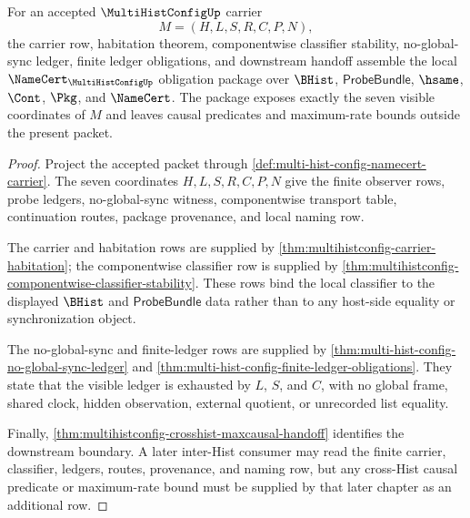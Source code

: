 \begin{theorem}
\label{thm:multihistconfig-namecert-obligation-package}
For an accepted $\MultiHistConfigUp$ carrier
$$
M=(H,L,S,R,C,P,N),
$$
the carrier row, habitation theorem, componentwise classifier stability, no-global-sync ledger, finite ledger obligations, and downstream handoff assemble the local $\NameCert_{\MultiHistConfigUp}$ obligation package over $\BHist$, $\mathsf{ProbeBundle}$, $\hsame$, $\Cont$, $\Pkg$, and $\NameCert$. The package exposes exactly the seven visible coordinates of $M$ and leaves causal predicates and maximum-rate bounds outside the present packet.
\end{theorem}
\begin{proof}
Project the accepted packet through \autoref{def:multi-hist-config-namecert-carrier}. The seven coordinates $H,L,S,R,C,P,N$ give the finite observer rows, probe ledgers, no-global-sync witness, componentwise transport table, continuation routes, package provenance, and local naming row.

The carrier and habitation rows are supplied by \autoref{thm:multihistconfig-carrier-habitation}; the componentwise classifier row is supplied by \autoref{thm:multihistconfig-componentwise-classifier-stability}. These rows bind the local classifier to the displayed $\BHist$ and $\mathsf{ProbeBundle}$ data rather than to any host-side equality or synchronization object.

The no-global-sync and finite-ledger rows are supplied by \autoref{thm:multi-hist-config-no-global-sync-ledger} and \autoref{thm:multi-hist-config-finite-ledger-obligations}. They state that the visible ledger is exhausted by $L$, $S$, and $C$, with no global frame, shared clock, hidden observation, external quotient, or unrecorded list equality.

Finally, \autoref{thm:multihistconfig-crosshist-maxcausal-handoff} identifies the downstream boundary. A later inter-Hist consumer may read the finite carrier, classifier, ledgers, routes, provenance, and naming row, but any cross-Hist causal predicate or maximum-rate bound must be supplied by that later chapter as an additional row.
\end{proof}


